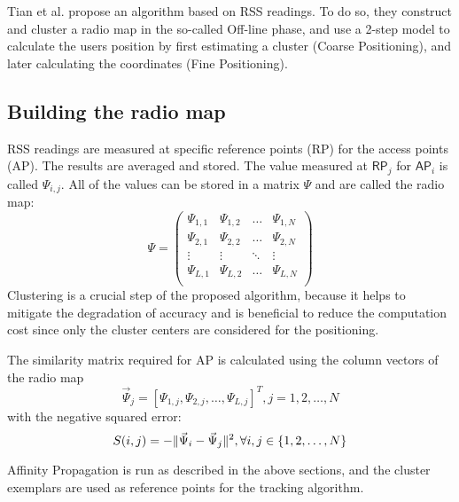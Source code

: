 \documentclass[11pt,a4paper]{article}
\DeclarePairedDelimiter\norm{\lVert}{\rVert}
\begin{document}
Tian et al. propose an algorithm based on RSS readings. To do so, they construct and cluster a radio map in the so-called Off-line phase, and use a 2-step model to calculate the users position by first estimating a cluster (Coarse Positioning), and later calculating the coordinates (Fine Positioning). \cite{tian2013fingerprint}
\subsection{Building the radio map}
RSS readings are measured at specific reference points (RP) for the access points (AP). The results are averaged and stored. The value measured at $\mathsf{RP}_j$ for $\mathsf{AP}_i$ is called $\Psi_{i,j}$. All of the values can be stored in a matrix $\Psi$ and are called the radio map\cite{tian2013fingerprint}:
\[\Psi = 
\left( \begin{array}{cccc}
\Psi_{1,1} & \Psi_{1,2} & \dots & \Psi_{1,N} \\                                              
\Psi_{2,1} & \Psi_{2,2} & \dots & \Psi_{2,N} \\
\vdots & \vdots & \ddots & \vdots \\
\Psi_{L,1} & \Psi_{L,2} & \dots & \Psi_{L,N} \\                                        
\end{array}\right)
\]
Clustering is a crucial step of the proposed algorithm, because it helps to mitigate the degradation of accuracy and is beneficial to reduce the computation cost since only the cluster centers are considered for the positioning. \cite{tian2013fingerprint}

The similarity matrix required for AP is calculated using the column vectors of the radio map
\[
\vec{\Psi}_j = \left[\Psi_{1,j}, \Psi_{2,j}, \dots , \Psi_{L,j}\right]^T, j=1,2,\dots , N
\]
with the negative squared error:
\[
S(i,j) = -\norm{\vec{\Psi}_i - \vec{\Psi}_j}^2, \forall i,j \in \{ 1,2,\dots , N \}
\]

Affinity Propagation is run as described in the above sections, and the cluster exemplars are used as reference points for the tracking algorithm.\cite{tian2013fingerprint}
\end{document}
